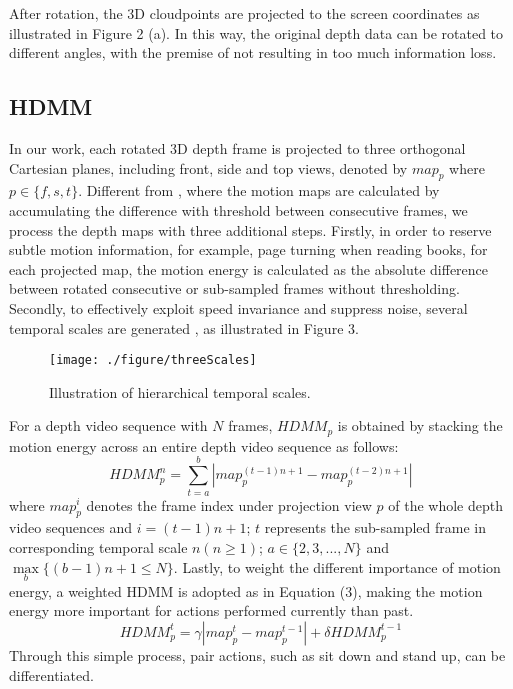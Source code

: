 \documentclass[conference]{IEEEtran}
\begin{document}
After rotation, the 3D cloudpoints are projected to the screen coordinates as illustrated in Figure 2 (a). In this way, the original depth data can be rotated to different angles, with the premise of not resulting in too much information loss.

\subsection{HDMM}

In our work, each rotated 3D depth frame is projected to three orthogonal Cartesian planes, including front, side and top views, denoted by $map_{p}$ where $p \in \{f, s, t\}$. Different from \cite{Yang2012a}, where the motion maps are calculated by accumulating the difference with threshold between consecutive frames, we process the depth maps with three additional steps. Firstly, in order to reserve subtle motion information, for example, page turning when reading books, for each projected map, the motion energy is calculated as the absolute difference between rotated consecutive or sub-sampled frames without thresholding. Secondly, to effectively exploit speed invariance and suppress noise, several temporal scales are generated , as illustrated in Figure 3.
\begin{figure}[!ht]
\begin{center}{\texttt{[image: ./figure/threeScales]}}
\end{center}
\caption{Illustration of hierarchical temporal scales.}
\label{fig:framework}
\end{figure}
For a depth video sequence with $N$ frames, $HDMM_{p}$ is obtained by stacking the motion energy across an entire depth video sequence as follows:
\begin{equation}
HDMM_{p}^{n} = \sum_{t=a}^{b} \left| map_{p}^{(t-1)n + 1} - map_{p}^{(t-2)n + 1} \right|
\end{equation}
where $map_{p}^{i}$ denotes the frame index under projection view $p$ of the whole depth video sequences and $i = (t-1)n + 1$; $t$ represents the sub-sampled frame in corresponding temporal scale $n (n \geq 1)$; $a \in \{2, 3, ..., N\}$ and $\max \limits_{b}\{(b - 1)n + 1 \leq N\}$. Lastly, to weight the different importance of motion energy, a weighted HDMM is adopted as in Equation (3), making the motion energy more important for actions performed currently than past.
\begin{equation}
HDMM_{p}^{t} = \gamma \left| map_{p}^{t} - map_{p}^{t-1} \right | + \delta HDMM_{p}^{t-1}
\end{equation}
Through this simple process, pair actions, such as sit down and stand up, can be differentiated.
\end{document}
